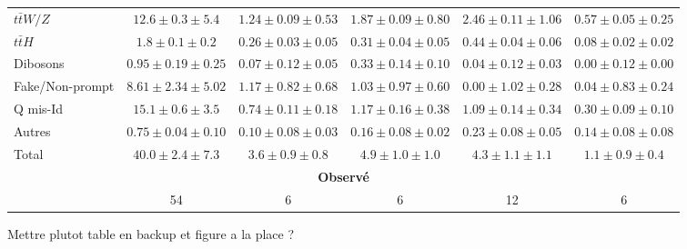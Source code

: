 \begin{frame}
\begin{table}[!htb]
\begin{center}
{\begin{tabular}{|l | c | c | c | c |c | }
       $t\bar{t}W/Z$            & $12.6 \pm 0.3 \pm 5.4$       & $1.24 \pm 0.09\pm 0.53$& $1.87 \pm 0.09\pm 0.80$ & $2.46 \pm 0.11\pm 1.06$ & $0.57\pm 0.05 \pm 0.25$ \\
      $t\bar{t}H$                & $1.8 \pm 0.1 \pm 0.2$           & $ 0.26 \pm 0.03 \pm 0.05$&  $0.31 \pm 0.04\pm 0.05$ & $0.44\pm 0.04\pm 0.06$ & $0.08\pm 0.02\pm 0.02$\\
       Dibosons                    & $0.95 \pm 0.19\pm 0.25$       & $0.07 \pm 0.12 \pm 0.05$ & $0.33\pm 0.14\pm 0.10$ & $0.04\pm 0.12\pm 0.03$ & $0.00\pm 0.12\pm 0.00$ \\
       Fake/Non-prompt   & $8.61 \pm 2.34 \pm 5.02$ & $1.17 \pm 0.82 \pm 0.68$&  $1.03\pm 0.97 \pm 0.60$ & $0.00\pm 1.02 \pm 0.28$ & $0.04\pm 0.83 \pm 0.24$\\    
       Q mis-Id                    & $15.1 \pm 0.6 \pm 3.5$           & $0.74 \pm 0.11 \pm 0.18$&  $1.17\pm 0.16 \pm 0.38$ & $1.09\pm 0.14 \pm 0.34$ & $0.30\pm 0.09 \pm 0.10$\\  
      Autres                        & $0.75 \pm 0.04 \pm 0.10$      & $0.10 \pm 0.08 \pm 0.03$ &  $0.16\pm 0.08\pm 0.02$ & $0.23\pm 0.08\pm 0.05$ & $0.14\pm 0.08\pm 0.08$\\        
\hline
       Total               & $40.0 \pm 2.4 \pm 7.3 $ & $3.6 \pm 0.9 \pm 0.8$ & $4.9 \pm 1.0 \pm 1.0 $ & $4.3 \pm 1.1 \pm 1.1 $ & $1.1 \pm 0.9 \pm 0.4 $\\

      \hline
       \multicolumn{6}{c}{\bf Observ\'e} \\ \cline{2-6}
       \multicolumn{1}{c|}{}                         & 54 & 6 & 6 & 12 & 6 \\ \cline{2-6}
    \end{tabular}}
  \end{center}
\end{table}

Mettre plutot table en backup et figure a la place ?
\end{frame}

